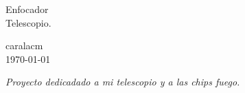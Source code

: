 \documentclass{article}
\newcommand{\fr}{\fuentetitulo\color{color_titulo}}
\newcommand{\fn}{\fuentetituloII\color{black}}
\begin{document}
    \begin{titlepage}
        \vspace*{1cm}
        {\fr\fontsize{80pt}{100pt}\selectfont
        Enfocador
        \\
        \fontsize{40pt}{10pt}\selectfont
        \hspace*{2pc}
        Telescopio.
        }
        {\fn\fontsize{30pt}{30pt}\selectfont
        \begin{flushright}
            caralacm\\
            \today
        \end{flushright}
        \vspace*{\fill} }
    \end{titlepage}

    \null\vfill
    \begin{center}
        \large{\textit{
            Proyecto dedicadado a mi telescopio y a las chips fuego.
            }}
    \end{center}
    \vfill
\newpage
\end{document}
